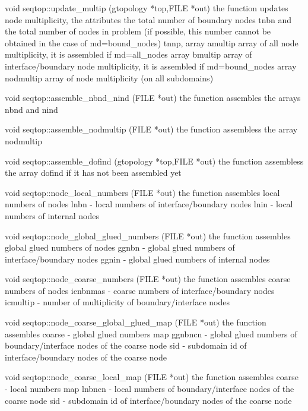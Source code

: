 \noindent
{\color{red} void seqtop::update\_multip (gtopology *top,FILE *out)}
the function updates node multiplicity,
the attributes the total number of boundary nodes {\sf tnbn} and
the total number of nodes in problem (if possible, this number cannot be
obtained in the case of md=bound\_nodes) {\sf tnnp},
array {\sf amultip} array of all node multiplicity, it is assembled if md=all\_nodes
array {\sf bmultip} array of interface/boundary node multiplicity, it is assembled if md=bound\_nodes
array {\sf nodmultip} array of node multiplicity (on all subdomains)

\noindent
{\color{red} void seqtop::assemble\_nbnd\_nind (FILE *out)}
the function assembles the arrays {\sf nbnd} and {\sf nind}

\noindent
{\color{red} void seqtop::assemble\_nodmultip (FILE *out)}
the function assembless the array {\sf nodmultip}

\noindent
{\color{red} void seqtop::assemble\_dofind (gtopology *top,FILE *out)}
the function assembless the array {\sf dofind} if it has not been assembled yet


\noindent
{\color{red} void seqtop::node\_local\_numbers (FILE *out)}
the function assembles local numbers of nodes
{\sf lnbn} - local numbers of interface/boundary nodes
{\sf lnin} - local numbers of internal nodes

\noindent
{\color{red} void seqtop::node\_global\_glued\_numbers (FILE *out)}
the function assembles global glued numbers of nodes
{\sf ggnbn} - global glued numbers of interface/boundary nodes
{\sf ggnin} - global glued numbers of internal nodes

\noindent
{\color{red} void seqtop::node\_coarse\_numbers (FILE *out)}
the function assembles coarse numbers of nodes
{\sf icnbnmas} - coarse numbers of interface/boundary nodes
{\sf icmultip} - number of multiplicity of boundary/interface nodes

\noindent
{\color{red} void seqtop::node\_coarse\_global\_glued\_map (FILE *out)}
the function assembles coarse - global glued numbers map
{\sf ggnbncn} - global glued numbers of boundary/interface nodes of the coarse node
{\sf sid} - subdomain id of interface/boundary nodes of the coarse node

\noindent
{\color{red} void seqtop::node\_coarse\_local\_map (FILE *out)}
the function assembles coarse - local numbers map
{\sf lnbncn} - local numbers of boundary/interface nodes of the coarse node
{\sf sid} - subdomain id of interface/boundary nodes of the coarse node













